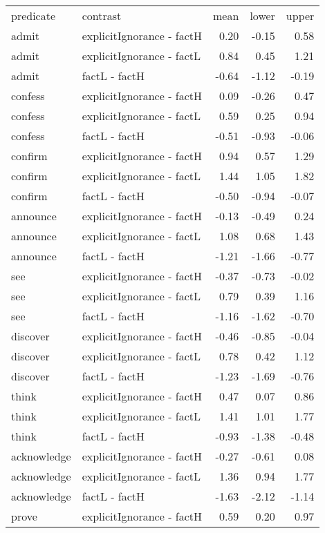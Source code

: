 \begin{longtable}{llrrr}
 predicate & contrast & mean & lower & upper \\ 
 admit & explicitIgnorance - factH & 0.20 & -0.15 & 0.58 \\ 
  admit & explicitIgnorance - factL & 0.84 & 0.45 & 1.21 \\ 
  admit & factL - factH & -0.64 & -1.12 & -0.19 \\ 
  confess & explicitIgnorance - factH & 0.09 & -0.26 & 0.47 \\ 
  confess & explicitIgnorance - factL & 0.59 & 0.25 & 0.94 \\ 
  confess & factL - factH & -0.51 & -0.93 & -0.06 \\ 
  confirm & explicitIgnorance - factH & 0.94 & 0.57 & 1.29 \\ 
  confirm & explicitIgnorance - factL & 1.44 & 1.05 & 1.82 \\ 
  confirm & factL - factH & -0.50 & -0.94 & -0.07 \\ 
  announce & explicitIgnorance - factH & -0.13 & -0.49 & 0.24 \\ 
  announce & explicitIgnorance - factL & 1.08 & 0.68 & 1.43 \\ 
  announce & factL - factH & -1.21 & -1.66 & -0.77 \\ 
  see & explicitIgnorance - factH & -0.37 & -0.73 & -0.02 \\ 
  see & explicitIgnorance - factL & 0.79 & 0.39 & 1.16 \\ 
  see & factL - factH & -1.16 & -1.62 & -0.70 \\ 
  discover & explicitIgnorance - factH & -0.46 & -0.85 & -0.04 \\ 
  discover & explicitIgnorance - factL & 0.78 & 0.42 & 1.12 \\ 
  discover & factL - factH & -1.23 & -1.69 & -0.76 \\ 
  think & explicitIgnorance - factH & 0.47 & 0.07 & 0.86 \\ 
  think & explicitIgnorance - factL & 1.41 & 1.01 & 1.77 \\ 
  think & factL - factH & -0.93 & -1.38 & -0.48 \\ 
  acknowledge & explicitIgnorance - factH & -0.27 & -0.61 & 0.08 \\ 
  acknowledge & explicitIgnorance - factL & 1.36 & 0.94 & 1.77 \\ 
  acknowledge & factL - factH & -1.63 & -2.12 & -1.14 \\ 
  prove & explicitIgnorance - factH & 0.59 & 0.20 & 0.97 \\ 

\end{longtable}
